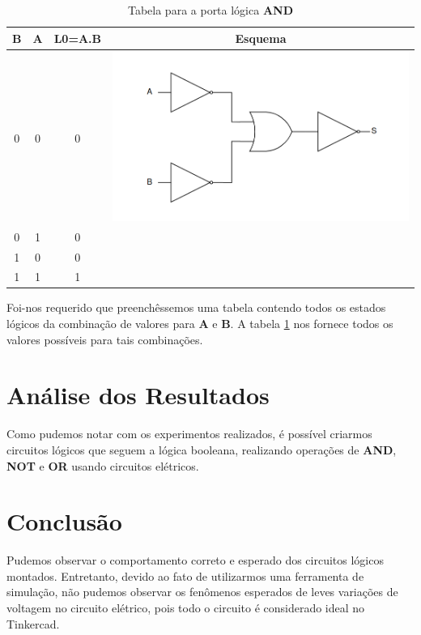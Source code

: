 \documentclass[12pt]{article}
\begin{document}
\begin{table}[H]
    \centering
    \caption{Tabela para a porta lógica \textbf{AND}}
    \begin{tabular}{|c|c|c|c|}
    \hline
    \textbf{B} & \textbf{A} & \textbf{L0}=A.B & \textbf{Esquema} \\
    \hline
    0 & 0 & 0 & \multirow{}{}{\includegraphics[width=.7\textwidth]{exp1_2.3_f1.png}} \\ \cline{1-3}
    0 & 1 & 0 &  \\ \cline{1-3}
    1 & 0 & 0 &  \\ \cline{1-3}
    1 & 1 & 1 &  \\ \hline
    \end{tabular}
    \label{tab:tabela_and}
\end{table}

Foi-nos requerido que preenchêssemos uma tabela contendo todos os estados
lógicos da combinação de valores para \textbf{A} e \textbf{B}. A tabela
\ref{tab:tabela_and} nos fornece todos os valores possíveis para tais
combinações.

\section{Análise dos Resultados}
\label{sec:Resultados}

Como pudemos notar com os experimentos realizados, é possível criarmos circuitos
lógicos que seguem a lógica booleana, realizando operações de \textbf{AND},
\textbf{NOT} e \textbf{OR} usando circuitos elétricos.

\section{Conclusão}
\label{sec:Conclusao}

Pudemos observar o comportamento correto e esperado dos circuitos lógicos
montados. Entretanto, devido ao fato de utilizarmos uma ferramenta de simulação,
não pudemos observar os fenômenos esperados de leves variações de voltagem no
circuito elétrico, pois todo o circuito é considerado ideal no Tinkercad.
\end{document}
